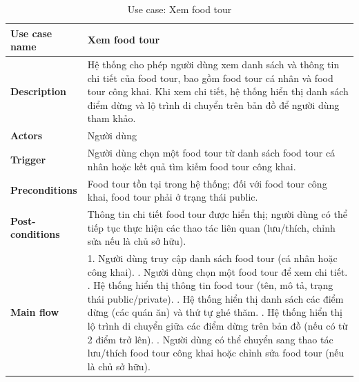 \begingroup
\renewcommand{\arraystretch}{1.25}
\begin{longtable}{|p{4cm}|p{10cm}|}
\caption{Use case: Xem food tour} \\
\endfirsthead

\endhead

\endfoot

\endlastfoot

\hline

\textbf{Use case name} &
Xem food tour \\
\hline

\textbf{Description} &
Hệ thống cho phép người dùng xem danh sách và thông tin chi tiết của food tour, bao gồm food tour cá nhân và food tour công khai. Khi xem chi tiết, hệ thống hiển thị danh sách điểm dừng và lộ trình di chuyển trên bản đồ để người dùng tham khảo. \\
\hline

\textbf{Actors} &
Người dùng \\
\hline

\textbf{Trigger} &
Người dùng chọn một food tour từ danh sách food tour cá nhân hoặc kết quả tìm kiếm food tour công khai. \\
\hline

\textbf{Preconditions} &
Food tour tồn tại trong hệ thống; đối với food tour công khai, food tour phải ở trạng thái public. \\
\hline

\textbf{Post-conditions} &
Thông tin chi tiết food tour được hiển thị; người dùng có thể tiếp tục thực hiện các thao tác liên quan (lưu/thích, chỉnh sửa nếu là chủ sở hữu). \\
\hline

\textbf{Main flow} &
1. Người dùng truy cập danh sách food tour (cá nhân hoặc công khai). \newline 2. Người dùng chọn một food tour để xem chi tiết. \newline 3. Hệ thống hiển thị thông tin food tour (tên, mô tả, trạng thái public/private). \newline 4. Hệ thống hiển thị danh sách các điểm dừng (các quán ăn) và thứ tự ghé thăm. \newline 5. Hệ thống hiển thị lộ trình di chuyển giữa các điểm dừng trên bản đồ (nếu có từ 2 điểm trở lên). \newline 6. Người dùng có thể chuyển sang thao tác lưu/thích food tour công khai hoặc chỉnh sửa food tour (nếu là chủ sở hữu). \\
\hline


\end{longtable}
